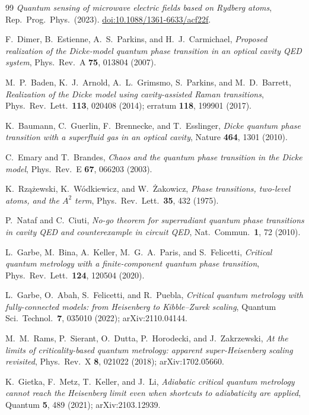 \documentclass[11pt,a4paper]{article}
\begin{document}
\begin{thebibliography}{99}
 \emph{Quantum sensing of microwave electric fields based on Rydberg
  atoms}, Rep.~Prog.~Phys.\ (2023).
  \href{https://doi.org/10.1088/1361-6633/acf22f}{doi:10.1088/1361-6633/acf22f}.

 F.~Dimer, B.~Estienne, A.~S.~Parkins, and H.~J.~Carmichael,
  \emph{Proposed realization of the Dicke-model quantum phase transition in an optical cavity
  QED system}, Phys.~Rev.~A \textbf{75}, 013804 (2007).

 M.~P.~Baden, K.~J.~Arnold, A.~L.~Grimsmo, S.~Parkins, and M.~D.~Barrett,
  \emph{Realization of the Dicke model using cavity-assisted Raman transitions},
  Phys.~Rev.~Lett.~\textbf{113}, 020408 (2014); erratum \textbf{118}, 199901 (2017).

 K.~Baumann, C.~Guerlin, F.~Brennecke, and T.~Esslinger,
  \emph{Dicke quantum phase transition with a superfluid gas in an optical cavity},
  Nature \textbf{464}, 1301 (2010).

 C.~Emary and T.~Brandes,
  \emph{Chaos and the quantum phase transition in the Dicke model},
  Phys.~Rev.~E \textbf{67}, 066203 (2003).

 K.~Rz\k{a}\.zewski, K.~W\'odkiewicz, and W.~\.Zakowicz,
  \emph{Phase transitions, two-level atoms, and the $A^2$ term},
  Phys.~Rev.~Lett.~\textbf{35}, 432 (1975).

 P.~Nataf and C.~Ciuti,
  \emph{No-go theorem for superradiant quantum phase transitions in cavity QED and counterexample
  in circuit QED}, Nat.~Commun.~\textbf{1}, 72 (2010).

 L.~Garbe, M.~Bina, A.~Keller, M.~G.~A.~Paris, and S.~Felicetti,
  \emph{Critical quantum metrology with a finite-component quantum phase transition},
  Phys.~Rev.~Lett.~\textbf{124}, 120504 (2020).

 L.~Garbe, O.~Abah, S.~Felicetti, and R.~Puebla,
  \emph{Critical quantum metrology with fully-connected models: from Heisenberg to
  Kibble--Zurek scaling}, Quantum Sci.~Technol.~\textbf{7}, 035010 (2022); arXiv:2110.04144.

 M.~M.~Rams, P.~Sierant, O.~Dutta, P.~Horodecki, and J.~Zakrzewski,
  \emph{At the limits of criticality-based quantum metrology: apparent super-Heisenberg
  scaling revisited}, Phys.~Rev.~X \textbf{8}, 021022 (2018); arXiv:1702.05660.

 K.~Gietka, F.~Metz, T.~Keller, and J.~Li,
  \emph{Adiabatic critical quantum metrology cannot reach the Heisenberg limit even when
  shortcuts to adiabaticity are applied}, Quantum \textbf{5}, 489 (2021); arXiv:2103.12939.


\end{thebibliography}
\end{document}
